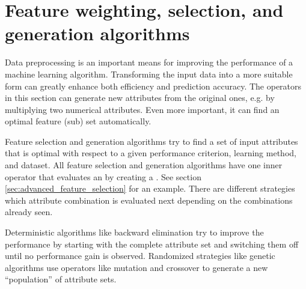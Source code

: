 \section{Feature weighting, selection, and generation algorithms}
\label{sec:reference_feature}

Data preprocessing is an important means for improving the performance
of a machine learning algorithm. Transforming the input data into a
more suitable form can greatly enhance both efficiency and prediction
accuracy. The operators in this section can generate new attributes from the
original ones, e.g. by multiplying two numerical attributes. Even more
important, it can find an optimal feature (sub) set automatically.

Feature selection and generation algorithms try to find a set of input
attributes that is optimal with respect to a given performance
criterion, learning method, and dataset. All feature selection and
generation algorithms have one inner operator that evaluates an
 by creating a . See
section \ref{sec:advanced_feature_selection} for an example. There are different
strategies which attribute combination is evaluated next depending
on the combinations already seen. 

Deterministic algorithms like backward elimination try to improve the
performance by starting with the complete attribute set and switching
them off until no performance gain is observed. Randomized strategies
like genetic algorithms use operators like mutation and crossover to
generate a new ``population'' of attribute sets.
